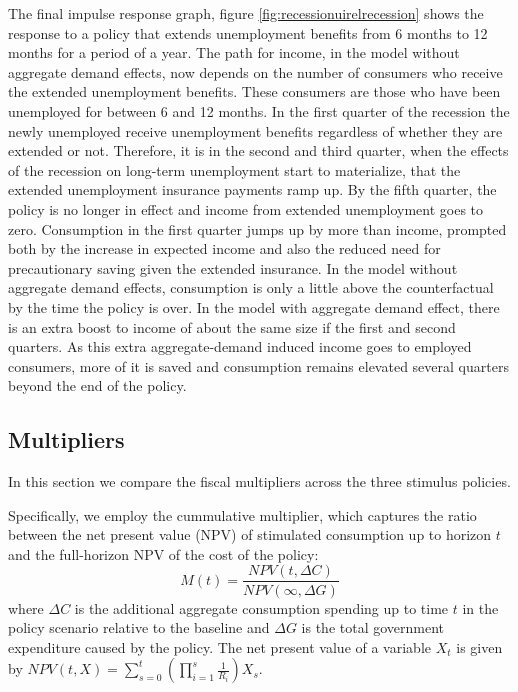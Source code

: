 \documentclass[../HAFiscal]{subfiles}
\begin{document}
The final impulse response graph, figure \ref{fig:recessionuirelrecession} shows the response to a policy that extends unemployment benefits from 6 months to 12 months for a period of a year. The path for income, in the model without aggregate demand effects, now depends on the number of consumers who receive the extended unemployment benefits. These consumers are those who have been unemployed for between 6 and 12 months. In the first quarter of the recession the newly unemployed receive unemployment benefits regardless of whether they are extended or not. Therefore, it is in the second and third quarter, when the effects of the recession on long-term unemployment start to materialize, that the extended unemployment insurance payments ramp up. By the fifth quarter, the policy is no longer in effect and income from extended unemployment goes to zero. Consumption in the first quarter jumps up by more than income, prompted both by the increase in expected income and also the reduced need for precautionary saving given the extended insurance. In the model without aggregate demand effects, consumption is only a little above the counterfactual by the time the policy is over. In the model with aggregate demand effect, there is an extra boost to income of about the same size if the first and second quarters. As this extra aggregate-demand induced income goes to employed consumers, more of it is saved and consumption remains elevated several quarters beyond the end of the policy.



\FloatBarrier
\subsection{Multipliers}

In this section we compare the fiscal multipliers across the three stimulus policies. 

Specifically, we employ the cummulative multiplier, which captures the ratio between the net present value (NPV) of stimulated consumption up to horizon $t$ and the full-horizon NPV of the cost of the policy:
\begin{equation*}
M(t) = \frac{NPV(t,\Delta C)}{NPV (\infty,\Delta G)}
\end{equation*}
where $\Delta C$ is the additional aggregate consumption spending up to time $t$ in the policy scenario relative to the baseline and $\Delta G$ is the total government expenditure caused by the policy. The net present value of a variable $X_t$ is given by 
$NPV(t,X) = \sum_{s=0}^{t} \left( \prod_{i=1}^{s} \frac{1}{R_i} \right) X_s$. 
\end{document}
